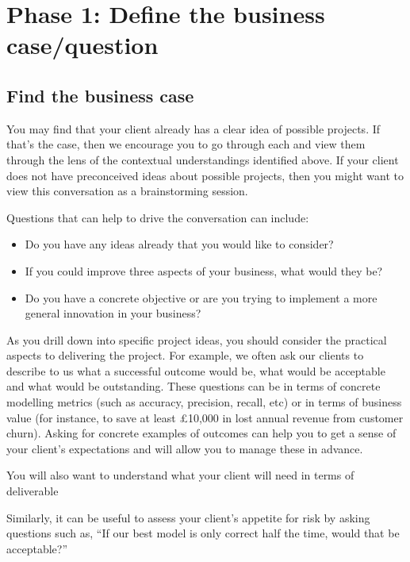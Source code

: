 \documentclass[
]{book}
\providecommand{\tightlist}{%
  \setlength{\itemsep}{0pt}\setlength{\parskip}{0pt}}
\begin{document}
\hypertarget{phase-1-define-the-business-casequestion}{%
\section{Phase 1: Define the business case/question}\label{phase-1-define-the-business-casequestion}}

\hypertarget{find-the-business-case}{%
\subsection{Find the business case}\label{find-the-business-case}}

You may find that your client already has a clear idea of possible projects. If that's the case, then we encourage you to go through each and view them through the lens of the contextual understandings identified above. If your client does not have preconceived ideas about possible projects, then you might want to view this conversation as a brainstorming session.

Questions that can help to drive the conversation can include:

\begin{itemize}
\tightlist
\item
  Do you have any ideas already that you would like to consider?
\item
  If you could improve three aspects of your business, what would they be?
\item
  Do you have a concrete objective or are you trying to implement a more general innovation in your business?
\end{itemize}

As you drill down into specific project ideas, you should consider the practical aspects to delivering the project. For example, we often ask our clients to describe to us what a successful outcome would be, what would be acceptable and what would be outstanding. These questions can be in terms of concrete modelling metrics (such as accuracy, precision, recall, etc) or in terms of business value (for instance, to save at least £10,000 in lost annual revenue from customer churn). Asking for concrete examples of outcomes can help you to get a sense of your client's expectations and will allow you to manage these in advance.

You will also want to understand what your client will need in terms of deliverable

Similarly, it can be useful to assess your client's appetite for risk by asking questions such as, ``If our best model is only correct half the time, would that be acceptable?''
\end{document}

